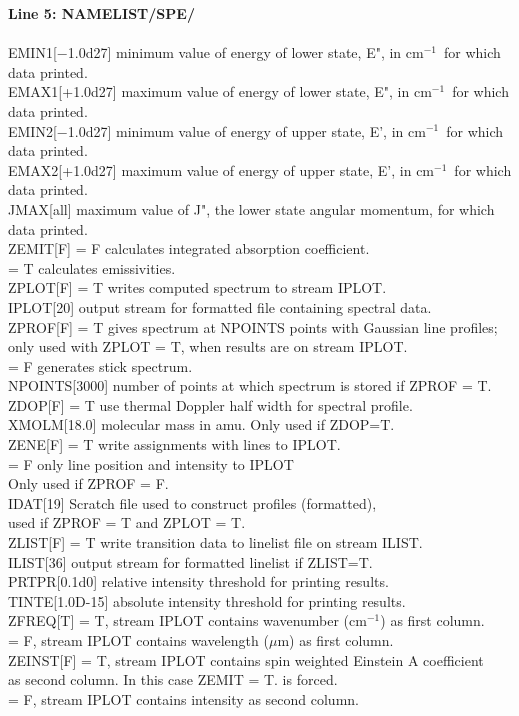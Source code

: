 \documentclass{elsart}
\def\cm{{cm$^{-1}$}}
\begin{document}
\begin{tabbing}
{\bf Line 5: NAMELIST/SPE/}\\
\\
EMIN1[$-$1.0d27]  minimum value of energy of lower state, E", in \cm\ for which
data printed.\\
EMAX1[+1.0d27]  maximum value of energy of lower state, E", in \cm\ for which
data printed.\\
EMIN2[$-$1.0d27]  minimum value of energy of upper state, E', in \cm\ for which
data printed.\\
EMAX2[+1.0d27]  maximum value of energy of upper state, E', in \cm\ for which
data printed.\\
JMAX[all] \> maximum value of J", the lower state angular momentum, for which
data printed.\\
ZEMIT[F] \> = F calculates integrated absorption coefficient.\\
         \> = T calculates emissivities.\\
ZPLOT[F] \> = T writes computed spectrum to stream IPLOT.\\
IPLOT[20] \> output stream for formatted file containing spectral data.\\
ZPROF[F] \> = T gives spectrum at NPOINTS points with  Gaussian
line profiles;\\
         \> only used with ZPLOT = T, when results are on stream IPLOT.\\
         \> = F generates stick spectrum.\\
NPOINTS[3000] number of points at which spectrum is stored if ZPROF = T.\\
ZDOP[F] \> = T use thermal Doppler half width for spectral profile.\\
XMOLM[18.0] molecular mass in amu. Only used if ZDOP=T.\\
ZENE[F] \> = T write assignments with lines to IPLOT.\\
        \> = F only line position and intensity to IPLOT\\
        \> Only used if ZPROF = F.\\
IDAT[19] \> Scratch file used to construct profiles (formatted),\\
\> used if ZPROF = T and ZPLOT = T.\\
ZLIST[F] \> = T write transition data to linelist file on stream ILIST.\\
ILIST[36] \> output stream for formatted linelist if ZLIST=T.\\
PRTPR[0.1d0] relative intensity threshold for printing results.\\
TINTE[1.0D-15] absolute intensity threshold for printing results.\\
ZFREQ[T] \> = T, stream IPLOT contains wavenumber (\cm ) as first column.\\
         \> = F, stream IPLOT contains wavelength ($\mu$m) as first
column.\\
ZEINST[F] \> = T, stream IPLOT contains spin weighted Einstein A
coefficient\\
\> as second column. In this case ZEMIT = T. is forced.\\
          \> = F, stream IPLOT contains intensity as second column.\\
\end{tabbing}
\end{document}
